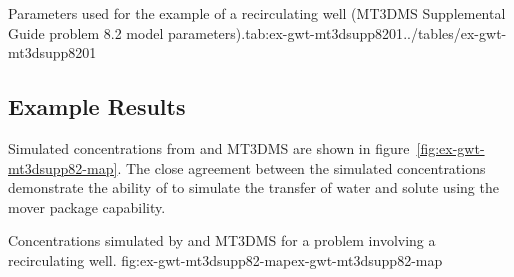 \begin{StandardTable}{Parameters used for the example of a recirculating well (MT3DMS Supplemental Guide problem 8.2 model parameters).}{tab:ex-gwt-mt3dsupp8201}{../tables/ex-gwt-mt3dsupp8201}
\end{StandardTable}

\subsection{Example Results}

Simulated concentrations from \mf and MT3DMS are shown in figure~\ref{fig:ex-gwt-mt3dsupp82-map}.  The close agreement between the simulated concentrations demonstrate the ability of \mf to simulate the transfer of water and solute using the mover package capability.

\begin{StandardFigure}{
                                     Concentrations simulated by \mf and MT3DMS for a problem involving a recirculating well.
                                     }{fig:ex-gwt-mt3dsupp82-map}{ex-gwt-mt3dsupp82-map}
\end{StandardFigure}                                 

